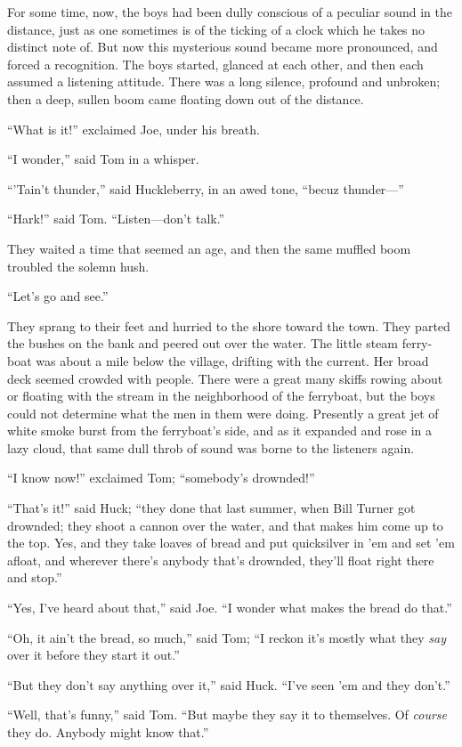 \documentclass{book}
\begin{document}
For some time, now, the boys had been dully conscious of a peculiar sound in the distance, just as one sometimes is of the ticking of a clock which he takes no distinct note of. But now this mysterious sound became more pronounced, and forced a recognition. The boys started, glanced at each other, and then each assumed a listening attitude. There was a long silence, profound and unbroken; then a deep, sullen boom came floating down out of the distance.

“What is it!” exclaimed Joe, under his breath.

“I wonder,” said Tom in a whisper.

“’Tain’t thunder,” said Huckleberry, in an awed tone, “becuz thunder—”

“Hark!” said Tom. “Listen—don’t talk.”

They waited a time that seemed an age, and then the same muffled boom troubled the solemn hush.

“Let’s go and see.”

They sprang to their feet and hurried to the shore toward the town. They parted the bushes on the bank and peered out over the water. The little steam ferry-boat was about a mile below the village, drifting with the current. Her broad deck seemed crowded with people. There were a great many skiffs rowing about or floating with the stream in the neighborhood of the ferryboat, but the boys could not determine what the men in them were doing. Presently a great jet of white smoke burst from the ferryboat’s side, and as it expanded and rose in a lazy cloud, that same dull throb of sound was borne to the listeners again.

“I know now!” exclaimed Tom; “somebody’s drownded!”

“That’s it!” said Huck; “they done that last summer, when Bill Turner got drownded; they shoot a cannon over the water, and that makes him come up to the top. Yes, and they take loaves of bread and put quicksilver in ’em and set ’em afloat, and wherever there’s anybody that’s drownded, they’ll float right there and stop.”

“Yes, I’ve heard about that,” said Joe. “I wonder what makes the bread do that.”

“Oh, it ain’t the bread, so much,” said Tom; “I reckon it’s mostly what they \emph{say} over it before they start it out.”

“But they don’t say anything over it,” said Huck. “I’ve seen ’em and they don’t.”

“Well, that’s funny,” said Tom. “But maybe they say it to themselves. Of \emph{course} they do. Anybody might know that.”
\end{document}
